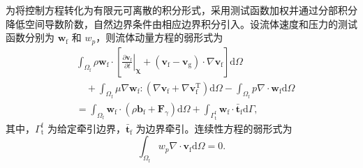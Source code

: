 为将控制方程转化为有限元可离散的积分形式，采用测试函数加权并通过分部积分降低空间导数阶数，自然边界条件由相应边界积分引入。设流体速度和压力的测试函数分别为 $\boldsymbol{w}_{\mathrm f}$ 和 $w_p$，则流体动量方程的弱形式为
\begin{equation}
\begin{aligned}
&\int_{\Omega_{\mathrm f}}
\rho\boldsymbol{w}_{\mathrm f}\cdot
\left[
\left.
\frac{\partial\boldsymbol{v}_{\mathrm f}}{\partial t}
\right|_{\boldsymbol{\chi}}
+
\left(
\boldsymbol{v}_{\mathrm f}-\boldsymbol{v}_{\mathrm g}
\right)
\cdot\nabla\boldsymbol{v}_{\mathrm f}
\right]
\mathrm d\Omega
\\
&\quad
+
\int_{\Omega_{\mathrm f}}
\mu\nabla\boldsymbol{w}_{\mathrm f}:
\left(
\nabla\boldsymbol{v}_{\mathrm f}
+
\nabla\boldsymbol{v}_{\mathrm f}^{\mathrm T}
\right)
\mathrm d\Omega
-
\int_{\Omega_{\mathrm f}}
p\nabla\cdot\boldsymbol{w}_{\mathrm f}
\mathrm d\Omega
\\
&=
\int_{\Omega_{\mathrm f}}
\boldsymbol{w}_{\mathrm f}\cdot
\left(
\rho\boldsymbol{b}_{\mathrm f}
+
\boldsymbol{F}_{\gamma}
\right)
\mathrm d\Omega
+
\int_{\Gamma_{\mathrm t}^{\mathrm f}}
\boldsymbol{w}_{\mathrm f}\cdot\bar{\boldsymbol{t}}_{\mathrm f}
\mathrm d\Gamma,
\label{eq:ch2_weak_fluid_momentum}
\end{aligned}
\end{equation}
其中，$\Gamma_{\mathrm t}^{\mathrm f}$ 为给定牵引边界，$\bar{\boldsymbol{t}}_{\mathrm f}$ 为边界牵引。连续性方程的弱形式为
\begin{equation}
\int_{\Omega_{\mathrm f}}
w_p\nabla\cdot\boldsymbol{v}_{\mathrm f}
\mathrm d\Omega
=0.
\label{eq:ch2_weak_continuity}
\end{equation}

